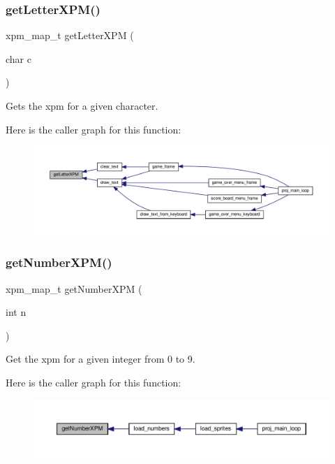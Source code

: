 \subsubsection{\texorpdfstring{get\+Letter\+X\+P\+M()}{getLetterXPM()}}
{\footnotesize\ttfamily xpm\+\_\+map\+\_\+t get\+Letter\+X\+PM (\begin{DoxyParamCaption}\item[{char}]{c }\end{DoxyParamCaption})}



Gets the xpm for a given character. 

Here is the caller graph for this function\+:\nopagebreak
\begin{figure}[H]
\begin{center}
\leavevmode
\includegraphics[width=350pt]{group__utils_ga8e2a12eed020ad751697c4f2d1a725dc_icgraph}
\end{center}
\end{figure}
\mbox{\label{group__utils_gaf0aa8dc23073c285e1b6b0c3ae16aefb}} 
\subsubsection{\texorpdfstring{get\+Number\+X\+P\+M()}{getNumberXPM()}}
{\footnotesize\ttfamily xpm\+\_\+map\+\_\+t get\+Number\+X\+PM (\begin{DoxyParamCaption}\item[{int}]{n }\end{DoxyParamCaption})}



Get the xpm for a given integer from 0 to 9. 

Here is the caller graph for this function\+:\nopagebreak
\begin{figure}[H]
\begin{center}
\leavevmode
\includegraphics[width=350pt]{group__utils_gaf0aa8dc23073c285e1b6b0c3ae16aefb_icgraph}
\end{center}
\end{figure}
\mbox{\label{group__utils_ga1214184725b2f89d6ae427ecd9041295}} 
